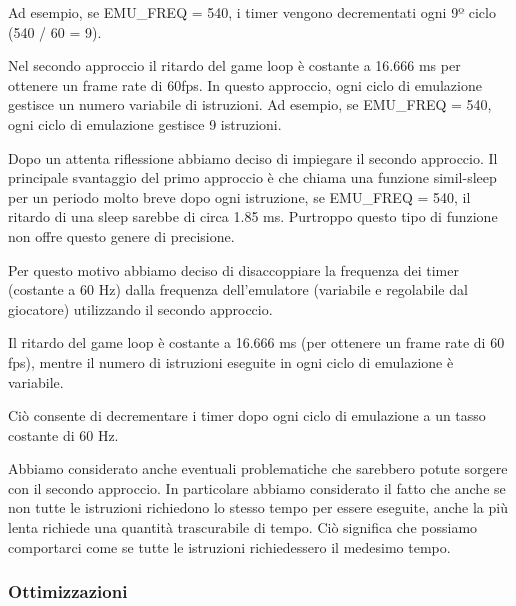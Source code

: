 \documentclass[a4paper]{article}
\begin{document}
Ad esempio, se EMU\_FREQ = 540, i timer vengono
decrementati ogni 9º ciclo (540 / 60 = 9).

Nel secondo approccio il ritardo del game loop è costante
a 16.666 ms per ottenere un frame rate di 60fps. In questo approccio,
ogni ciclo di emulazione gestisce un numero variabile di istruzioni.
Ad esempio, se EMU\_FREQ = 540, ogni ciclo di emulazione gestisce
9 istruzioni.

Dopo un attenta riflessione abbiamo deciso di impiegare il secondo
approccio. Il principale svantaggio del primo approccio è che chiama
una funzione simil-sleep per un periodo molto breve dopo ogni
istruzione, se EMU\_FREQ = 540, il ritardo di una sleep sarebbe
di circa 1.85 ms. Purtroppo questo tipo di funzione non offre questo
genere di precisione.

Per questo motivo abbiamo deciso di disaccoppiare la frequenza dei
timer (costante a 60 Hz) dalla frequenza dell'emulatore (variabile e
regolabile dal giocatore) utilizzando il secondo approccio.

Il ritardo del game loop è costante a 16.666 ms (per ottenere
un frame rate di 60 fps), mentre il numero di istruzioni eseguite
in ogni ciclo di emulazione è variabile.

Ciò consente di decrementare i timer dopo ogni ciclo di emulazione
a un tasso costante di 60 Hz.

Abbiamo considerato anche eventuali problematiche che sarebbero
potute sorgere con il secondo approccio. In particolare abbiamo
considerato il fatto che anche se non tutte le istruzioni richiedono
lo stesso tempo per essere eseguite, anche la più lenta richiede
una quantità trascurabile di tempo. Ciò significa che possiamo
comportarci come se tutte le istruzioni richiedessero il medesimo
tempo.


\subsubsection{Ottimizzazioni}
\end{document}
